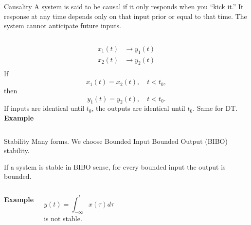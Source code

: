 \begin{frame}{Causality}
    A system is said to be causal if it only responds when you ``kick it.'' It response at any time depends only on that input prior or equal to that time. The system cannot anticipate future inputs.

    \begin{columns}
            \begin{align*}
              x_1(t) &\rightarrow y_1(t) \\
              x_2(t) &\rightarrow y_2(t) \\
            \end{align*}
            If
            \begin{equation*}
                x_1(t) = x_2(t) , \quad t < t_0,
            \end{equation*}
            then
            \begin{equation*}
                y_1(t) = y_2(t) , \quad t < t_0.
            \end{equation*}
            If inputs are identical until $t_0$, the outputs are identical until $t_0$. Same for DT.
        \textbf{ Example}
    \end{columns}
\end{frame}

\begin{frame}{Stability}
    Many forms. We choose Bounded Input Bounded Output (BIBO) stability.\par
    If a system is stable in BIBO sense, for every bounded input the output is bounded.
    {
        \begin{columns}
            \textbf{ Example}\par
            \begin{equation*}
                y(t) = \int_{-\infty}^{t}x(\tau)d\tau
            \end{equation*}
            is not stable.
        \end{columns}
    }
\end{frame}

